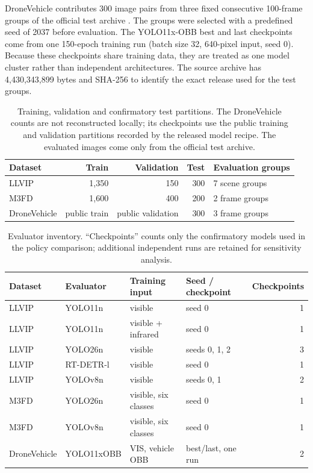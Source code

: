 \documentclass[preprint,11pt]{elsarticle}
\begin{document}
DroneVehicle contributes 300 image pairs from three fixed consecutive
100-frame groups of the official test archive \cite{sun2022}. The groups were
selected with a predefined seed of 2037 before evaluation. The YOLO11x-OBB
best and last checkpoints come from one 150-epoch training run (batch size 32,
640-pixel input, seed 0). Because these checkpoints share training data, they
are treated as one model cluster rather than independent architectures. The
source archive has 4,430,343,899 bytes and SHA-256
\texttt{}
to identify the exact release used for the test groups.

\begin{table}[t]
\centering
\small
\caption{Training, validation and confirmatory test partitions. The
DroneVehicle counts are not reconstructed locally; its checkpoints use the
public training and validation partitions recorded by the released model
recipe. The evaluated images come only from the official test archive.}
\label{tab:data}
\begin{tabular}{@{}lrrrl@{}}
\toprule
Dataset & Train & Validation & Test & Evaluation groups \\
\midrule
LLVIP & 1,350 & 150 & 300 & 7 scene groups \\
M3FD & 1,600 & 400 & 200 & 2 frame groups \\
DroneVehicle & public train & public validation & 300 & 3 frame groups \\
\bottomrule
\end{tabular}
\end{table}

\begin{table}[t]
\centering
\small
\caption{Evaluator inventory. ``Checkpoints'' counts only the confirmatory
models used in the policy comparison; additional independent runs are retained
for sensitivity analysis.}
\label{tab:evaluators}
\begin{tabular}{@{}>{\raggedright\arraybackslash}p{1.65cm}
>{\raggedright\arraybackslash}p{2.35cm}
>{\raggedright\arraybackslash}p{2.6cm}
>{\raggedright\arraybackslash}p{2.65cm}r@{}}
\toprule
Dataset & Evaluator & Training input & Seed / checkpoint & Checkpoints \\
\midrule
LLVIP & YOLO11n & visible & seed 0 & 1 \\
LLVIP & YOLO11n & visible + infrared & seed 0 & 1 \\
LLVIP & YOLO26n & visible & seeds 0, 1, 2 & 3 \\
LLVIP & RT-DETR-l & visible & seed 0 & 1 \\
LLVIP & YOLOv8n & visible & seeds 0, 1 & 2 \\
M3FD & YOLO26n & visible, six classes & seed 0 & 1 \\
M3FD & YOLOv8n & visible, six classes & seed 0 & 1 \\
Drone\-Vehicle & YOLO11x\-OBB & VIS, vehicle OBB & best/last, one run & 2 \\
\bottomrule
\end{tabular}
\end{table}
\end{document}
